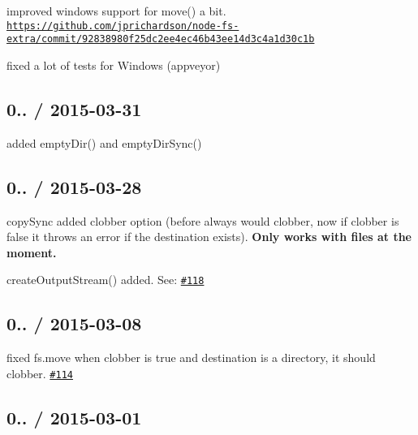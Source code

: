\begin{DoxyItemize}
\item improved windows support for {\ttfamily move()} a bit. \href{https://github.com/jprichardson/node-fs-extra/commit/92838980f25dc2ee4ec46b43ee14d3c4a1d30c1b}{\tt https\+://github.\+com/jprichardson/node-\/fs-\/extra/commit/92838980f25dc2ee4ec46b43ee14d3c4a1d30c1b}
\item fixed a lot of tests for Windows (appveyor)
\end{DoxyItemize}

\subsection*{0.. / 2015-\/03-\/31 }


\begin{DoxyItemize}
\item added {\ttfamily empty\+Dir()} and {\ttfamily empty\+Dir\+Sync()}
\end{DoxyItemize}

\subsection*{0.. / 2015-\/03-\/28 }


\begin{DoxyItemize}
\item {\ttfamily copy\+Sync} added {\ttfamily clobber} option (before always would clobber, now if {\ttfamily clobber} is {\ttfamily false} it throws an error if the destination exists). {\bfseries Only works with files at the moment.}
\item {\ttfamily create\+Output\+Stream()} added. See\+: \href{https://github.com/jprichardson/node-fs-extra/pull/118}{\tt \#118}
\end{DoxyItemize}

\subsection*{0.. / 2015-\/03-\/08 }


\begin{DoxyItemize}
\item fixed {\ttfamily fs.\+move} when {\ttfamily clobber} is {\ttfamily true} and destination is a directory, it should clobber. \href{https://github.com/jprichardson/node-fs-extra/issues/114}{\tt \#114}
\end{DoxyItemize}

\subsection*{0.. / 2015-\/03-\/01 }


